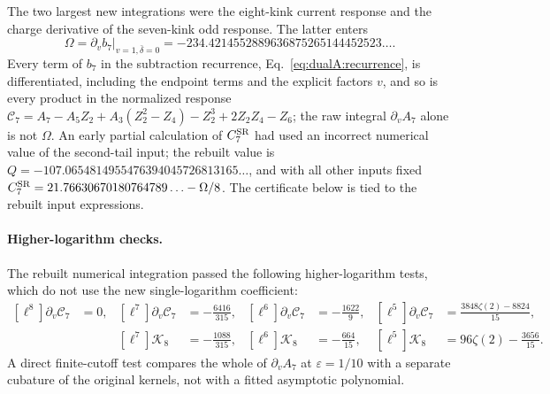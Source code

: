 \documentclass[11pt,a4paper]{article}
\numberwithin{equation}{section}
\newcommand{\CSR}{C^{\rm SR}}
\newcommand{\db}{\bar\delta}
\begin{document}
The two largest new integrations were the eight-kink current response and the charge derivative of the seven-kink odd
response. The latter enters
\begin{equation}
 \Omega=\partial_vb_7\big|_{v=1,\db=0}=-234.4214552889636875265144452523\ldots .
\end{equation}
Every term of $b_7$ in the subtraction recurrence, Eq.~\eqref{eq:dualA:recurrence}, is differentiated, including the
endpoint terms and the explicit factors $v$, and so is every product in the normalized response
$\mathcal C_7=A_7-A_5Z_2+A_3(Z_2^2-Z_4)-Z_2^3+2Z_2Z_4-Z_6$; the raw integral $\partial_vA_7$ alone is not $\Omega$.
An early partial calculation of $\CSR_7$ had used an incorrect numerical value of the second-tail input; the rebuilt
value is $Q=-107.0654814955476394045726813165\ldots$, and with all other inputs fixed
$\CSR_7=21.76630670180764789\ldots-\Omega/8$. The certificate below is tied to the rebuilt input expressions.

\paragraph{Higher-logarithm checks.} The rebuilt numerical integration passed the following higher-logarithm tests,
which do not use the new single-logarithm coefficient:
\begin{equation}
\begin{aligned}
 [\ell^8]\partial_v\mathcal C_7&=0, & [\ell^7]\partial_v\mathcal C_7&=-\frac{6416}{315}, &
 [\ell^6]\partial_v\mathcal C_7&=-\frac{1622}{9}, & [\ell^5]\partial_v\mathcal C_7&=\frac{3848\zeta(2)-8824}{15},\\
 && [\ell^7]\mathcal K_8&=-\frac{1088}{315}, & [\ell^6]\mathcal K_8&=-\frac{664}{15}, &
 [\ell^5]\mathcal K_8&=96\zeta(2)-\frac{3656}{15}.
\end{aligned}
\end{equation}
A direct finite-cutoff test compares the whole of $\partial_vA_7$ at $\varepsilon=1/10$ with a separate cubature of the
original kernels, not with a fitted asymptotic polynomial.
\end{document}
